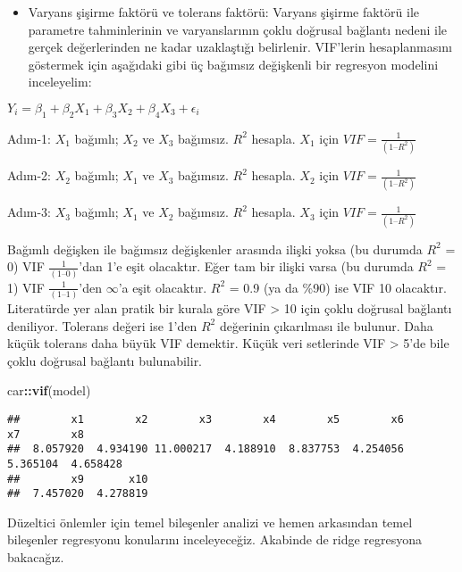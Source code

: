 \documentclass[
]{book}
\newenvironment{Shaded}{\begin{snugshade}}{\end{snugshade}}
\newcommand{\KeywordTok}[1]{\textcolor[rgb]{0.13,0.29,0.53}{\textbf{#1}}}
\newcommand{\NormalTok}[1]{#1}
\newcommand{\OperatorTok}[1]{\textcolor[rgb]{0.81,0.36,0.00}{\textbf{#1}}}
\providecommand{\tightlist}{%
  \setlength{\itemsep}{0pt}\setlength{\parskip}{0pt}}
\begin{document}
\begin{itemize}
\tightlist
\item
  Varyans şişirme faktörü ve tolerans faktörü: Varyans şişirme faktörü ile parametre tahminlerinin ve varyanslarının çoklu doğrusal bağlantı nedeni ile gerçek değerlerinden ne kadar uzaklaştığı belirlenir. VIF'lerin hesaplanmasını göstermek için aşağıdaki gibi üç bağımsız değişkenli bir regresyon modelini inceleyelim:
\end{itemize}

\(Y_i = \beta_1 + \beta_2X_1 + \beta_3X_2 + \beta_4X_3 + \epsilon_i\)

Adım-1: \(X_1\) bağımlı; \(X_2\) ve \(X_3\) bağımsız. \(R^2\) hesapla. \(X_1\) için \(VIF = \frac{1}{(1 – R^2)}\)

Adım-2: \(X_2\) bağımlı; \(X_1\) ve \(X_3\) bağımsız. \(R^2\) hesapla. \(X_2\) için \(VIF = \frac{1}{(1 – R^2)}\)

Adım-3: \(X_3\) bağımlı; \(X_1\) ve \(X_2\) bağımsız. \(R^2\) hesapla. \(X_3\) için \(VIF = \frac{1}{(1 – R^2)}\)

Bağımlı değişken ile bağımsız değişkenler arasında ilişki yoksa (bu durumda \(R^2\) = 0) VIF \(\frac{1}{(1 – 0)}\)'dan 1'e eşit olacaktır. Eğer tam bir ilişki varsa (bu durumda \(R^2\) = 1) VIF \(\frac{1}{(1 – 1)}\)'den \(\infty\)'a eşit olacaktır. \(R^2\) = 0.9 (ya da \%90) ise VIF 10 olacaktır. Literatürde yer alan pratik bir kurala göre VIF \textgreater{} 10 için çoklu doğrusal bağlantı deniliyor. Tolerans değeri ise 1'den \(R^2\) değerinin çıkarılması ile bulunur. Daha küçük tolerans daha büyük VIF demektir. Küçük veri setlerinde VIF \textgreater{} 5'de bile çoklu doğrusal bağlantı bulunabilir.

\begin{Shaded}
\begin{Highlighting}[]
\NormalTok{car}\OperatorTok{::}\KeywordTok{vif}\NormalTok{(model)}
\end{Highlighting}
\end{Shaded}

\begin{verbatim}
##        x1        x2        x3        x4        x5        x6        x7        x8 
##  8.057920  4.934190 11.000217  4.188910  8.837753  4.254056  5.365104  4.658428 
##        x9       x10 
##  7.457020  4.278819
\end{verbatim}

Düzeltici önlemler için temel bileşenler analizi ve hemen arkasından temel bileşenler regresyonu konularını inceleyeceğiz. Akabinde de ridge regresyona bakacağız.
\end{document}
